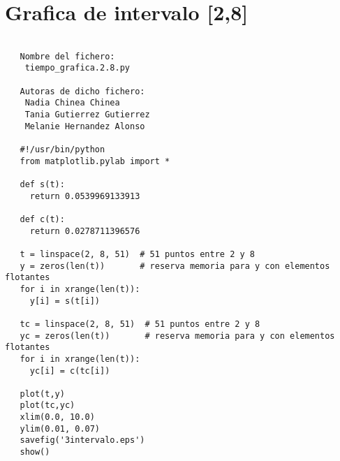 \section{Grafica de intervalo [2,8]}
\label{sec7}
\begin{center}
\begin{footnotesize}
\begin{verbatim}
   
   Nombre del fichero:
    tiempo_grafica.2.8.py

   Autoras de dicho fichero:
    Nadia Chinea Chinea 
    Tania Gutierrez Gutierrez 
    Melanie Hernandez Alonso

   #!/usr/bin/python
   from matplotlib.pylab import *

   def s(t):
     return 0.0539969133913

   def c(t):
     return 0.0278711396576 

   t = linspace(2, 8, 51)  # 51 puntos entre 2 y 8
   y = zeros(len(t))       # reserva memoria para y con elementos flotantes
   for i in xrange(len(t)):
     y[i] = s(t[i])

   tc = linspace(2, 8, 51)  # 51 puntos entre 2 y 8
   yc = zeros(len(t))       # reserva memoria para y con elementos flotantes
   for i in xrange(len(t)):
     yc[i] = c(tc[i])

   plot(t,y)
   plot(tc,yc)
   xlim(0.0, 10.0)
   ylim(0.01, 0.07)
   savefig('3intervalo.eps')
   show()  
   
\end{verbatim}
\end{footnotesize}
\end{center}
